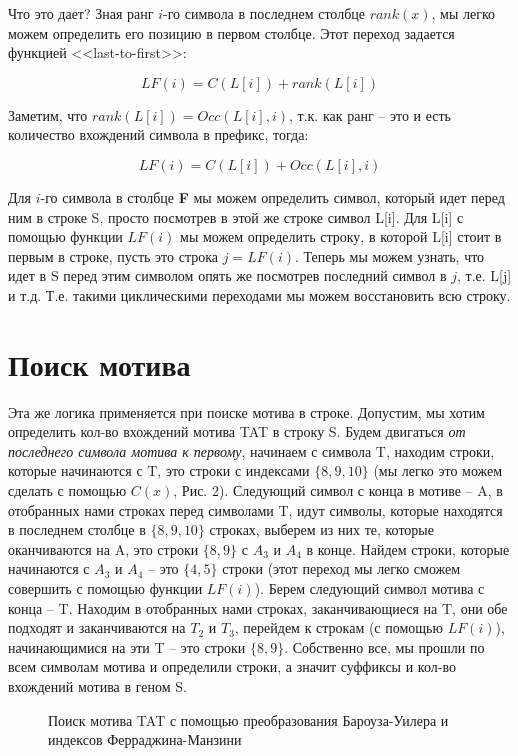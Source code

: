 \documentclass[letterpaper, 11pt]{article}
\begin{document}
Что это дает? Зная ранг $i$-го символа в последнем столбце $rank(x)$, мы легко можем определить его позицию в первом столбце. Этот переход задается функцией <<last-to-first>>:

$$LF(i) = C(L[i]) + rank(L[i])$$

Заметим, что $rank(L[i]) = Occ(L[i], i)$, т.к. как ранг -- это и есть количество вхождений символа в префикс, тогда:

$$LF(i) = C(L[i]) + Occ(L[i], i)$$

Для $i$-го символа в столбце \textbf{F} мы можем определить символ, который идет перед ним в строке S, просто посмотрев в этой же строке символ L[i]. Для L[i] с помощью функции $LF(i)$ мы можем определить строку, в которой L[i] стоит в первым в строке, пусть это строка $j = LF(i)$. Теперь мы можем узнать, что идет в S перед этим символом опять же посмотрев последний символ в $j$, т.е. L[j] и т.д. Т.е. такими циклическими переходами мы можем восстановить всю строку.

\section{Поиск мотива}
Эта же логика применяется при поиске мотива в строке. Допустим, мы хотим определить кол-во вхождений мотива TAT в строку S. Будем двигаться \textit{от последнего символа мотива к первому}, начинаем с символа T, находим строки, которые начинаются с T, это строки с индексами $\{8, 9, 10\}$ (мы легко это можем сделать с помощью $C(x)$, Рис. 2). Следующий символ с конца в мотиве -- A, в отобранных нами строках перед символами T, идут символы, которые находятся в последнем столбце в $\{8, 9, 10\}$ строках, выберем из них те, которые оканчиваются на A, это строки $\{8, 9\}$ с $A_3$ и $A_4$ в конце. Найдем строки, которые начинаются с $A_3$ и $A_4$ -- это $\{4, 5\}$ строки (этот переход мы легко сможем совершить с помощью функции $LF(i)$). Берем следующий символ мотива с конца -- T. Находим в отобранных нами строках, заканчивающиеся на T, они обе подходят и заканчиваются на $T_2$ и $T_3$, перейдем к строкам (с помощью $LF(i)$), начинающимися на эти T -- это строки $\{8, 9\}$. Собственно все, мы прошли по всем символам мотива и определили строки, а значит суффиксы и кол-во вхождений мотива в геном S.

\begin{figure}[H]
  \caption{Поиск мотива TAT с помощью преобразования Бароуза-Уилера и индексов Ферраджина-Манзини}
\end{figure}
\end{document}
